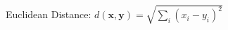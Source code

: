 \documentclass[preview]{standalone}
\begin{document}
\begin{center}
Euclidean Distance: $d(\mathbf{x}, \mathbf{y}) = \sqrt{\sum_i (x_i - y_i)^2}$
\end{center}
\end{document}
